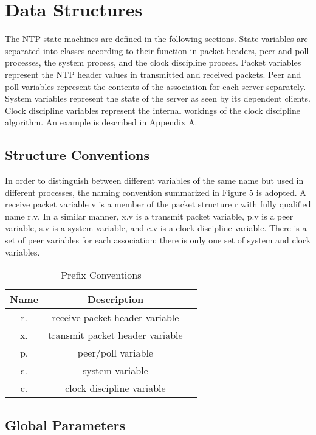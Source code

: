 \chapter{Data Structures}

The NTP state machines are defined in the following sections. State
variables are separated into classes according to their function in
packet headers, peer and poll processes, the system process, and the
clock discipline process. Packet variables represent the NTP header
values in transmitted and received packets. Peer and poll variables
represent the contents of the association for each server separately.
System variables represent the state of the server as seen by its
dependent clients. Clock discipline variables represent the internal
workings of the clock discipline algorithm. An example is described
in Appendix A.

\section{Structure Conventions}

In order to distinguish between different variables of the same name
but used in different processes, the naming convention summarized in
Figure 5 is adopted. A receive packet variable v is a member of the
packet structure r with fully qualified name r.v. In a similar
manner, x.v is a transmit packet variable, p.v is a peer variable,
s.v is a system variable, and c.v is a clock discipline variable.
There is a set of peer variables for each association; there is only
one set of system and clock variables.

\begin{table}[htb]
\center
\begin{tabular}{c | c | c}
Name & Description \\
\hline
\hline
r. & receive packet header variable \\
x. & transmit packet header variable \\
p. & peer/poll variable \\
s. & system variable \\
c. & clock discipline variable \\
\hline
\end{tabular}
\label{prefix_conventions}
\caption{Prefix Conventions}
\end{table}

\section{Global Parameters}

